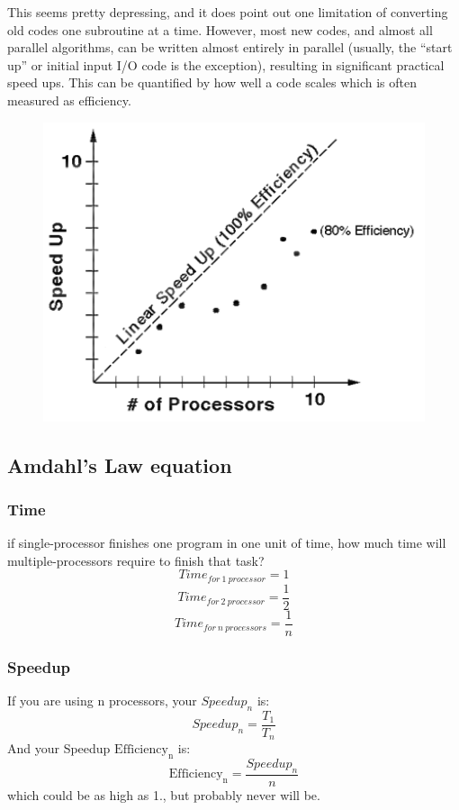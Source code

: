 \documentclass[12pt, a4paper]{book}
\begin{document}

This seems pretty depressing, and it does point out one limitation of converting old
codes one subroutine at a time. However, most new codes, and almost all parallel
algorithms, can be written almost entirely in parallel (usually, the “start up” or
initial input I/O code is the exception), resulting in significant practical speed ups.
This can be quantified by how well a code scales which is often measured as
efficiency.
\begin{figure}[h]
    \centering
    \includegraphics[width=0.5\linewidth]{figures/amdahl-law03.png}
\end{figure}
\subsection{Amdahl's Law equation}
\subsubsection{Time}
if single-processor finishes one program in one unit of time, how much time will multiple-processors require to finish that task?\\
\begin{equation}
    Time_{for\ 1\ processor} = 1
\end{equation}
\begin{equation}
    Time_{for\ 2\ processor} = \frac{1}{2}
\end{equation}
\begin{equation}
    Time_{for\ n\ processors} = \frac{1}{n}
\end{equation}
\subsubsection{Speedup}
If you are using n processors, your $Speedup_n$ is:
\begin{equation}
    Speedup_n = \frac{T_1}{T_n}
\end{equation}
And your Speedup $\mathrm{Efficiency_n}$ is:
\begin{equation}
    \mathrm{Efficiency_n} = \frac{Speedup_n}{n}
\end{equation}
which could be as high as 1., but probably never will be.
\end{document}
